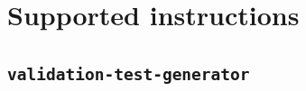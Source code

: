 \documentclass[a4paper]{article}
\begin{document}
\begin{appendix}

\pagestyle{empty}

\section{Supported instructions}



\begin{landscape}
\section{\texttt{validation-test-generator}}\label{code:validation-test-generator}
\begin{multicols}{2} %
\inputminted[mathescape,
             linenos,
             numbersep=5pt,
             frame=none,
             framesep=2mm,
             fontsize=\footnotesize]{python}{../src/main/test/java/se/filipallberg/dark/mips32decompiler/instruction/validation-test-generator.py}
\end{multicols}
\end{landscape}



\end{appendix}
\end{document}
